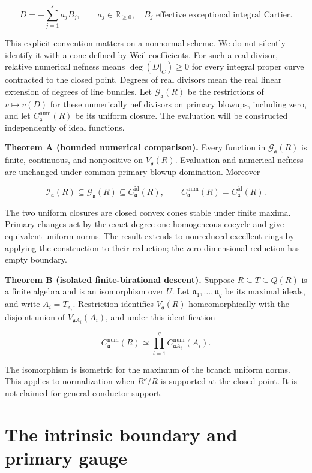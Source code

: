\documentclass[11pt]{article}
\begin{document}
\[
D=-\sum_{j=1}^s a_jB_j,\qquad a_j\in\mathbb R_{\geq0},\quad B_j\text{ effective exceptional integral Cartier}.
\]

This explicit convention matters on a nonnormal scheme. We do not silently identify it with a cone defined by Weil coefficients. For such a real divisor, relative numerical nefness means \(\deg(D|_C)\geq0\) for every integral proper curve contracted to the closed point. Degrees of real divisors mean the real linear extension of degrees of line bundles. Let \(\mathcal G_{\mathfrak a}(R)\) be the restrictions of \(v\mapsto v(D)\) for these numerically nef divisors on primary blowups, including zero, and let \(C^{\mathrm{num}}_{\mathfrak a}(R)\) be its uniform closure. The evaluation will be constructed independently of ideal functions.

\textbf{Theorem A (bounded numerical comparison).} Every function in \(\mathcal G_{\mathfrak a}(R)\) is finite, continuous, and nonpositive on \(V_{\mathfrak a}(R)\). Evaluation and numerical nefness are unchanged under common primary-blowup domination. Moreover

\[
\mathcal I_{\mathfrak a}(R)\subseteq\mathcal G_{\mathfrak a}(R)
\subseteq C^{\mathrm{id}}_{\mathfrak a}(R),\qquad
C^{\mathrm{num}}_{\mathfrak a}(R)=C^{\mathrm{id}}_{\mathfrak a}(R).
\]

The two uniform closures are closed convex cones stable under finite maxima. Primary changes act by the exact degree-one homogeneous cocycle and give equivalent uniform norms. The result extends to nonreduced excellent rings by applying the construction to their reduction; the zero-dimensional reduction has empty boundary.

\textbf{Theorem B (isolated finite-birational descent).} Suppose \(R\subseteq T\subseteq Q(R)\) is a finite algebra and is an isomorphism over \(U\). Let \(\mathfrak n_1,\ldots,\mathfrak n_q\) be its maximal ideals, and write \(A_i=T_{\mathfrak n_i}\). Restriction identifies \(V_{\mathfrak a}(R)\) homeomorphically with the disjoint union of \(V_{\mathfrak aA_i}(A_i)\), and under this identification

\[
C^{\mathrm{num}}_{\mathfrak a}(R)
\simeq\prod_{i=1}^q C^{\mathrm{num}}_{\mathfrak aA_i}(A_i).
\]

The isomorphism is isometric for the maximum of the branch uniform norms. This applies to normalization when \(R^\nu/R\) is supported at the closed point. It is not claimed for general conductor support.

\section{The intrinsic boundary and primary gauge}
\end{document}

